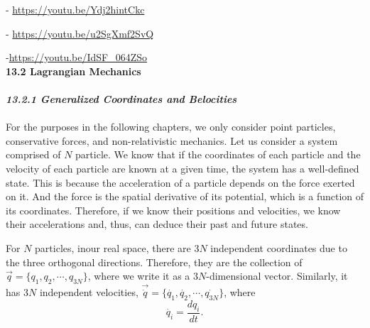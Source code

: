 \documentclass{article}
\newcommand{\bfit}[1]{\textit{\textbf{#1}}}
\begin{document}
- \url{https://youtu.be/Ydj2hintCkc}

- \url{https://youtu.be/u2SgXmf2SvQ}

-\url{https://youtu.be/IdSF_064ZSo}
\\[30pt]
\textbf{\large 13.2 Lagrangian Mechanics}
\\\\
\bfit{\large 13.2.1 Generalized Coordinates and Belocities}
\\\\
For the purposes in the following chapters, we only consider point particles, conservative forces,
and non-relativistic mechanics. Let us consider a system comprised of $N$ 
particle. We know that if the coordinates of each particle and the velocity of each particle are known at a 
given  time, the system has a well-defined state. This is because the
acceleration of a particle depends on the force exerted on it. 
And the force is the spatial derivative of its potential, which is a function of its
coordinates. Therefore, if we know their positions and velocities, we know
their accelerations and, thus, can deduce their past and future states.

For $N$ particles, inour real space, there are 3$N$ independent coordinates
due to the three orthogonal directions. Therefore, they are the collection of 
$\vec{q}=\{ q_1,q_2,\cdots,q_{3N} \}$, where we write it as a 3$N$-dimensional vector.
Similarly, it has 3$N$ independent velocities, $\vec{\dot{q}}=\{ \dot{q_1},\dot{q_2},\cdots,\dot{q_{3N}} \}$, where
\begin{equation}\label{eq 13.1}
    \dot{q_i}=\frac{dq_i}{dt}. \tag{13.1}
\end{equation}
\end{document}
